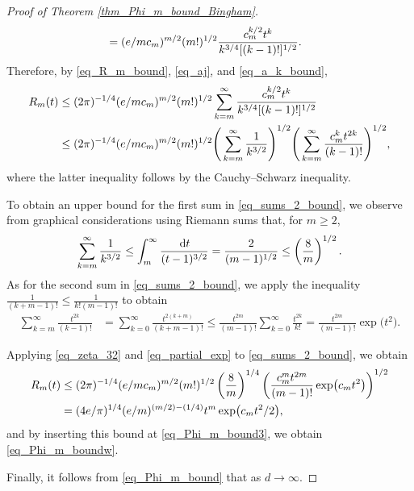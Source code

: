 \documentclass[11pt]{article}
\numberwithin{equation}{section}
\numberwithin{equation}{section}
\def\dd {\hskip1pt\mathrm{d}}
\begin{document}
\begin{proof}[Proof of Theorem \ref{thm_Phi_m_bound_Bingham}]
\begin{align}
&= ({\rm e}/m c_m)^{m/2} (m!)^{1/2} \frac{c_m^{k/2} t^k}{k^{3/4} [(k-1)!]^{1/2}}.
\end{align}
Therefore, by \eqref{eq_R_m_bound}, \eqref{eq_aj}, and \eqref{eq_a_k_bound},
\begin{align}
\label{eq_sums_2_bound}
R_m(t) &\le (2\pi)^{-1/4} ({\rm e}/m c_m)^{m/2} (m!)^{1/2} \sum_{k=m}^\infty \frac{c_m^{k/2} t^k}{k^{3/4} [(k-1)!]^{1/2}} \nonumber \\
&\le (2\pi)^{-1/4} ({\rm e}/m c_m)^{m/2} (m!)^{1/2} \Bigg(\sum_{k=m}^\infty \frac{1}{k^{3/2}}\Bigg)^{1/2} \Bigg(\sum_{k=m}^\infty \frac{c_m^k t^{2k}}{(k-1)!}\Bigg)^{1/2},
\end{align}
where the latter inequality follows by the Cauchy--Schwarz inequality.

To obtain an upper bound for the first sum in \eqref{eq_sums_2_bound}, we observe from graphical considerations using Riemann sums that, for $m \ge 2$,
\begin{equation}
\label{eq_zeta_32}
\sum_{k=m}^\infty \frac{1}{k^{3/2}} \le \int_m^\infty \frac{\dd t}{(t-1)^{3/2}} = \frac{2}{(m-1)^{1/2}} \le \left(\frac{8}{m}\right)^{1/2}.
\end{equation}
As for the second sum in \eqref{eq_sums_2_bound}, we apply the inequality
$
\frac{1}{(k+m-1)!} \le \frac{1}{k! (m-1)!}
$
to obtain
\begin{align}
\label{eq_partial_exp}
\sum_{k=m}^\infty \frac{t^{2k}}{(k-1)!} &= \sum_{k=0}^\infty \frac{t^{2(k+m)}}{(k+m-1)!} \le \frac{t^{2m}}{(m-1)!} \sum_{k=0}^\infty \frac{t^{2k}}{k!}
= \frac{t^{2m}}{(m-1)!} \exp\bigl(t^2\bigr).
\end{align}

Applying \eqref{eq_zeta_32} and \eqref{eq_partial_exp} to \eqref{eq_sums_2_bound}, we obtain
\begin{align}
R_m(t) &\le (2\pi)^{-1/4} ({\rm e}/m c_m)^{m/2} (m!)^{1/2} \left(\frac{8}{m}\right)^{1/4} \left(\frac{c_m^m t^{2m}}{(m-1)!} \exp\bigl(c_m t^2\bigr)\right)^{1/2} \nonumber \\
&= (4 {\rm e}/\pi)^{1/4} ({\rm e}/m)^{(m/2)-(1/4)} t^m \exp\bigl(c_m t^2/2\bigr),\label{eq_R_m_bound2}
\end{align}
and by inserting this bound at \eqref{eq_Phi_m_bound3}, we obtain \eqref{eq_Phi_m_boundw}.

Finally, it follows from \eqref{eq_Phi_m_bound} that  as $d \to \infty$.
\end{proof}
\end{document}
